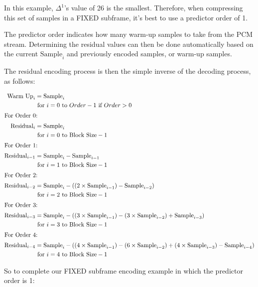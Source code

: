 In this example, $\Delta ^ 1$'s value of 26 is the smallest.
Therefore, when compressing this set of samples in a FIXED subframe,
it's best to use a predictor order of 1.

The predictor order indicates how many warm-up samples to take from
the PCM stream.
Determining the residual values can then be done automatically
based on the current $\text{Sample}_i$ and previously encoded samples, or
warm-up samples.

\clearpage

The residual encoding process is then the simple inverse of the
decoding process, as follows:

\begin{align*}
\text{Warm Up}_i &= \text{Sample}_i \\
& \text{ for } i = 0 \text{ to } Order - 1 \text{ if } Order > 0\\
\intertext{For Order 0:}
\text{Residual}_i &= \text{Sample}_i \\
& \text{ for } i = 0 \text{ to Block Size} - 1 \\
\intertext{For Order 1:}
\text{Residual}_{i - 1} &= \text{Sample}_i - \text{Sample}_{i - 1} \\
& \text{ for } i = 1 \text{ to Block Size} - 1 \\
\intertext{For Order 2:}
\text{Residual}_{i - 2} &= \text{Sample}_i - ((2 \times \text{Sample}_{i - 1}) - \text{Sample}_{i - 2}) \\
& \text{ for } i = 2 \text{ to Block Size} - 1 \\
\intertext{For Order 3:}
\text{Residual}_{i - 3} &= \text{Sample}_i - ((3 \times \text{Sample}_{i - 1}) - (3 \times \text{Sample}_{i - 2}) + \text{Sample}_{i - 3}) \\
& \text{ for } i = 3 \text{ to Block Size} - 1 \\
\intertext{For Order 4:}
\text{Residual}_{i - 4} &= \text{Sample}_i - ((4 \times \text{Sample}_{i - 1}) - (6 \times \text{Sample}_{i - 2}) + (4 \times \text{Sample}_{i - 3}) - \text{Sample}_{i - 4}) \\
& \text{ for } i = 4 \text{ to Block Size} - 1 \\
\end{align*}

\clearpage

So to complete our FIXED subframe encoding example in which the
predictor order is 1:

